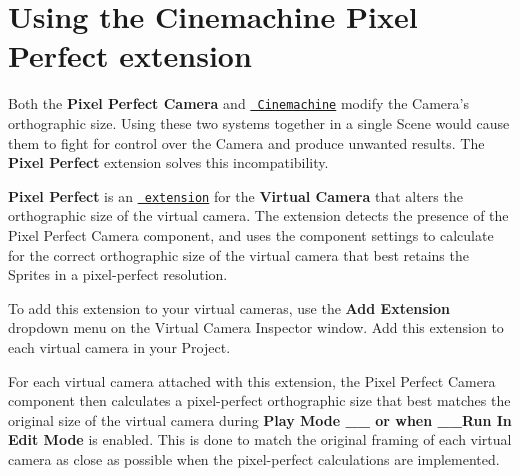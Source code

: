 \chapter{Using the Cinemachine Pixel Perfect extension}
\hypertarget{md__hey_tea_9_2_library_2_package_cache_2com_8unity_8render-pipelines_8universal_0d14_80_88_2_doc011373801dbe8e5eb862aa63d87183a}{}\label{md__hey_tea_9_2_library_2_package_cache_2com_8unity_8render-pipelines_8universal_0d14_80_88_2_doc011373801dbe8e5eb862aa63d87183a}
\label{md__hey_tea_9_2_library_2_package_cache_2com_8unity_8render-pipelines_8universal_0d14_80_88_2_doc011373801dbe8e5eb862aa63d87183a_autotoc_md2270}%
%
 Both the {\bfseries{Pixel Perfect Camera}} and \href{https://unity.com/unity/features/editor/art-and-design/cinemachine}{\texttt{ Cinemachine}} modify the Camera’s orthographic size. Using these two systems together in a single Scene would cause them to fight for control over the Camera and produce unwanted results. The {\bfseries{ Pixel Perfect}} extension solves this incompatibility.

{\bfseries{ Pixel Perfect}} is an \href{https://docs.unity3d.com/Packages/com.unity.cinemachine@2.2/manual/CinemachineVirtualCameraExtensions.html}{\texttt{ extension}} for the {\bfseries{ Virtual Camera}} that alters the orthographic size of the virtual camera. The extension detects the presence of the Pixel Perfect Camera component, and uses the component settings to calculate for the correct orthographic size of the virtual camera that best retains the Sprites in a pixel-\/perfect resolution.

To add this extension to your virtual cameras, use the {\bfseries{Add Extension}} dropdown menu on the  Virtual Camera Inspector window. Add this extension to each virtual camera in your Project.



For each virtual camera attached with this extension, the Pixel Perfect Camera component then calculates a pixel-\/perfect orthographic size that best matches the original size of the virtual camera during {\bfseries{Play Mode \+\_\+\+\_\+ or when \+\_\+\+\_\+\+Run In Edit Mode}} is enabled. This is done to match the original framing of each virtual camera as close as possible when the pixel-\/perfect calculations are implemented.

